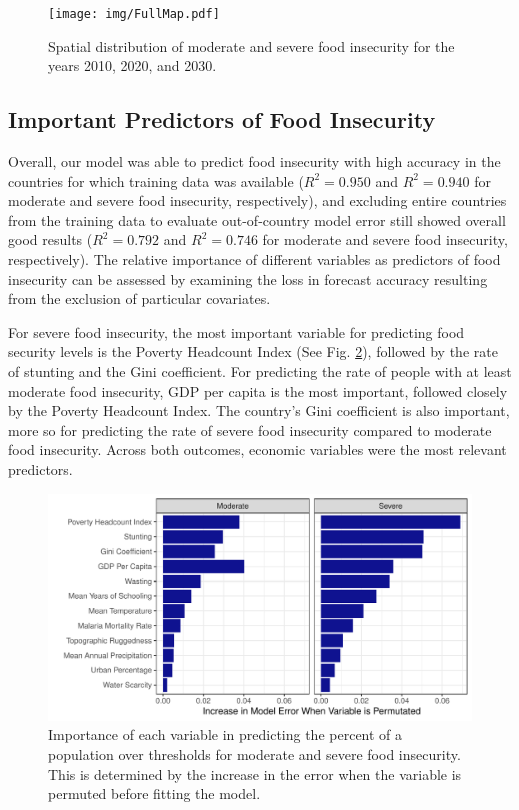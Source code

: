 \documentclass{article}
\begin{document}
\begin{landscape}
\begin{figure}[h]
  \centering
  \texttt{[image: img/FullMap.pdf]}
  \caption{Spatial distribution of moderate and severe food insecurity for the years 2010, 2020, and 2030.}
  \label{fig:map}
\end{figure}
\end{landscape}

\subsection{Important Predictors of Food Insecurity}
Overall, our model was able to predict food insecurity with high accuracy in the countries for which training data was available ($R^2 = 0.950$ and $R^2 = 0.940$ for moderate and severe food insecurity, respectively), and excluding entire countries from the training data to evaluate out-of-country model error still showed overall good results ($R^2 = 0.792$ and $R^2 = 0.746$ for moderate and severe food insecurity, respectively).  The relative importance of different variables as predictors of food insecurity can be assessed by examining the loss in forecast accuracy resulting from the exclusion of particular covariates.

For severe food insecurity, the most important variable for predicting food security levels is the Poverty Headcount Index (See Fig. \ref{fig:vimp}), followed by the rate of stunting and the Gini coefficient.  For predicting the rate of people with at least moderate food insecurity, GDP per capita is the most important, followed closely by the Poverty Headcount Index.  The country's Gini coefficient is also important, more so for predicting the rate of severe food insecurity compared to moderate food insecurity.  Across both outcomes, economic variables were the most relevant predictors.

\begin{figure}[h]
  \centering
  \includegraphics[width=\linewidth]{img/VIMP.pdf}
  \caption{Importance of each variable in predicting the percent of a population over thresholds for moderate and severe food insecurity.  This is determined by the increase in the error when the variable is permuted before fitting the model.}
  \label{fig:vimp}
\end{figure}
\end{document}
